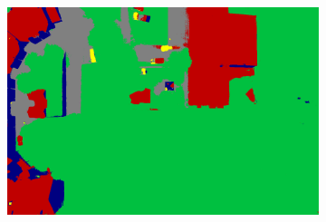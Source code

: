 \begin{figure}[htb]
\begin{subfigure}{0.243\columnwidth}
\end{subfigure}
\begin{subfigure}{0.243\columnwidth}
  \centering
  \includegraphics[width=1\linewidth]{fig/segmentation/DSC00793_6000_autocrf.png}
\end{subfigure}



\end{figure}
